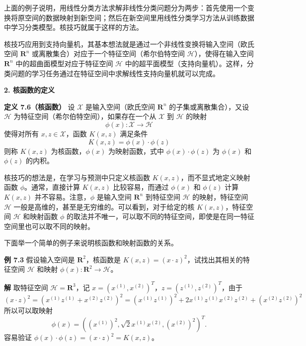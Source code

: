 \documentclass[UTF8,12pt,a4paper,fontset=fandol]{ctexart}
\begin{document}
上面的例子说明，用线性分类方法求解非线性分类问题分为两步：首先使用一个变换将原空间的数据映射到新空间；然后在新空间里用线性分类学习方法从训练数据中学习分类模型。核技巧就属于这样的方法。

核技巧应用到支持向量机，其基本想法就是通过一个非线性变换将输入空间（欧氏空间 $\mathbf{R}^n$ 或离散集合）对应于一个特征空间（希尔伯特空间 $\mathcal{H}$），使得在输入空间 $\mathbf{R}^n$ 中的超曲面模型对应于特征空间 $\mathcal{H}$ 中的超平面模型（支持向量机）。这样，分类问题的学习任务通过在特征空间中求解线性支持向量机就可以完成。

\noindent\textbf{2. 核函数的定义}\quad

\noindent\textbf{定义 7.6（核函数）}\quad
设 $\mathcal{X}$ 是输入空间（欧氏空间 $\mathbf{R}^n$ 的子集或离散集合），又设 $\mathcal{H}$ 为特征空间（希尔伯特空间），如果存在一个从 $\mathcal{X}$ 到 $\mathcal{H}$ 的映射
\begin{equation}
\phi(x):\mathcal{X}\to\mathcal{H}
\tag{7.65}
\end{equation}
使得对所有 $x,z\in\mathcal{X}$，函数 $K(x,z)$ 满足条件
\begin{equation}
K(x,z)=\phi(x)\cdot\phi(z)
\tag{7.66}
\end{equation}
则称 $K(x,z)$ 为核函数，$\phi(x)$ 为映射函数，式中 $\phi(x)\cdot\phi(z)$ 为 $\phi(x)$ 和 $\phi(z)$ 的内积。

核技巧的想法是，在学习与预测中只定义核函数 $K(x,z)$，而不显式地定义映射函数 $\phi$。通常，直接计算 $K(x,z)$ 比较容易，而通过 $\phi(x)$ 和 $\phi(z)$ 计算 $K(x,z)$ 并不容易。注意，$\phi$ 是输入空间 $\mathbf{R}^n$ 到特征空间 $\mathcal{H}$ 的映射，特征空间 $\mathcal{H}$ 一般是高维的，甚至是无穷维的。可以看到，对于给定的核 $K(x,z)$，特征空间 $\mathcal{H}$ 和映射函数 $\phi$ 的取法并不唯一，可以取不同的特征空间，即使是在同一特征空间里也可以取不同的映射。

下面举一个简单的例子来说明核函数和映射函数的关系。

\noindent\textbf{例 7.3}\quad
假设输入空间是 $\mathbf{R}^2$，核函数是 $K(x,z)=(x\cdot z)^2$，试找出其相关的特征空间 $\mathcal{H}$ 和映射 $\phi(x):\mathbf{R}^2\to\mathcal{H}$。

\noindent\textbf{解}\quad
取特征空间 $\mathcal{H}=\mathbf{R}^3$，记 $x=(x^{(1)},x^{(2)})^T$，$z=(z^{(1)},z^{(2)})^T$，由于
\[
(x\cdot z)^2=(x^{(1)}z^{(1)}+x^{(2)}z^{(2)})^2=(x^{(1)}z^{(1)})^2+2x^{(1)}z^{(1)}x^{(2)}z^{(2)}+(x^{(2)}z^{(2)})^2
\]
所以可以取映射
\[
\phi(x)=((x^{(1)})^2,\sqrt{2}x^{(1)}x^{(2)},(x^{(2)})^2)^T.
\]
容易验证 $\phi(x)\cdot\phi(z)=(x\cdot z)^2=K(x,z)$。
\end{document}
